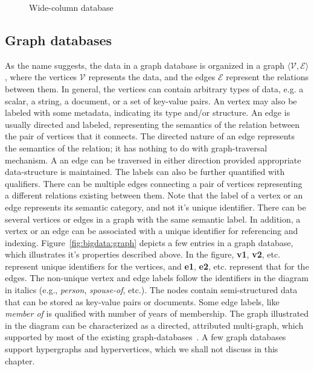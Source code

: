\begin{figure}
	\centerline{
	}
	\caption{Wide-column database}
	\label{fig:bigdata:wide-column}
\end{figure}

\subsection{Graph databases}
\label{sec:bigdata:graph}

As the name suggests, the data in a graph database is organized in a graph $\langle \mathcal{V}, \mathcal{E} \rangle$, where the 
vertices $\mathcal{V}$
represents the data, and the edges $\mathcal{E}$ represent the relations between them. In general, the vertices can contain arbitrary
types of data, e.g. a scalar, a string, a document, or a set of key-value pairs. An vertex may also be labeled with some metadata, 
indicating its type and/or structure. 
%
An edge is usually directed and labeled, representing the semantics of the relation between the pair of vertices that it connects. 
The directed nature of an edge represents the semantics of the relation; it has nothing to do with graph-traversal mechanism. A
an edge can be traversed in either direction provided appropriate data-structure is maintained.
The labels can also be further quantified with qualifiers. There can be multiple edges connecting a pair of vertices representing
a different relations existing between them. 
%
Note that the label of a vertex or an edge represents its semantic category, and not it's unique identifier. There can be several 
vertices or edges in a graph with the same semantic label. In addition, a vertex or an edge can be associated with a unique identifier
for referencing and indexing.
%
Figure~\ref{fig:bigdata:graph} depicts a few entries in a graph database, which illustrates it's properties described above. In the
figure, {\bf v1}, {\bf v2}, etc. represent unique identifiers for the vertices, and {\bf e1}, {\bf e2}, etc. represent that for the
edges. The non-unique vertex and edge labels follow the identifiers in the diagram in italics (e.g., {\it person}, {\it spouse-of},
etc.). The nodes contain semi-structured data that can be stored as key-value pairs or documents. Some edge labels, like  {\it member of} 
is qualified with number of years of membership.
%
The graph illustrated in the diagram can be characterized as a directed, attributed multi-graph, which supported by most of the
existing graph-databases~\citep{Junghanns:2017}. A few graph databases support hypergraphs and hypervertices, which we shall not 
discuss in this chapter. 

